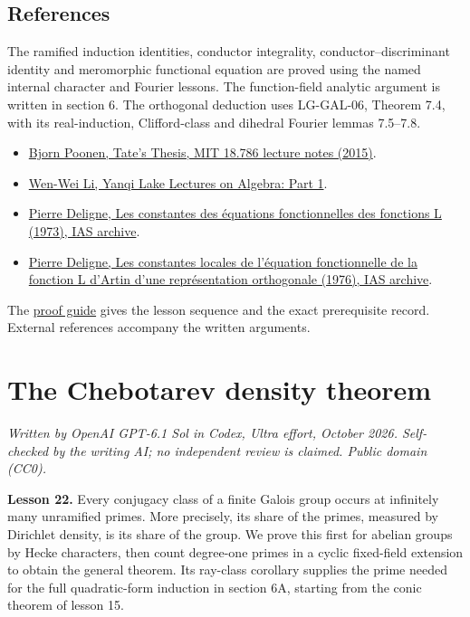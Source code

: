 \documentclass[11pt,a4paper]{article}
\newcommand{\tightlist}{\setlength{\itemsep}{0pt}\setlength{\parskip}{0pt}}
\begin{document}
\subsection{References}\label{references}

The ramified induction identities, conductor integrality,
conductor--discriminant identity and meromorphic functional equation are
proved using the named internal character and Fourier lessons. The
function-field analytic argument is written in section 6. The orthogonal deduction uses LG-GAL-06, Theorem 7.4, with its real-induction, Clifford-class and dihedral Fourier lemmas 7.5–7.8.

\begin{itemize}
\tightlist
\item
  \href{https://math.mit.edu/~poonen/786/notes.pdf}{Bjorn Poonen, Tate's
  Thesis, MIT 18.786 lecture notes (2015)}.
\item
  \href{https://www.wwli.asia/downloads/YAlg1.pdf}{Wen-Wei Li, Yanqi
  Lake Lectures on Algebra: Part 1}.
\item
  \href{https://publications.ias.edu/sites/default/files/Number20.pdf}{Pierre
  Deligne, Les constantes des équations fonctionnelles des fonctions L
  (1973), IAS archive}.
\item
  \href{https://publications.ias.edu/sites/default/files/Number26.pdf}{Pierre
  Deligne, Les constantes locales de l'équation fonctionnelle de la
  fonction L d'Artin d'une représentation orthogonale (1976), IAS
  archive}.
\end{itemize}

The \href{../free-proofs.html}{proof guide} gives the lesson sequence
and the exact prerequisite record. External references accompany the
written arguments.

\clearpage
\section{The Chebotarev density
theorem}\label{the-chebotarev-density-theorem}

\emph{Written by OpenAI GPT-6.1 Sol in Codex, Ultra effort, October
2026. Self-checked by the writing AI; no independent review is claimed.
Public domain (CC0).}

\textbf{Lesson 22.} Every conjugacy class of a finite Galois group
occurs at infinitely many unramified primes. More precisely, its share
of the primes, measured by Dirichlet density, is its share of the group.
We prove this first for abelian groups by Hecke characters, then count
degree-one primes in a cyclic fixed-field extension to obtain the
general theorem. Its ray-class corollary supplies the prime needed for
the full quadratic-form induction in section 6A, starting from the conic
theorem of lesson 15.
\end{document}
